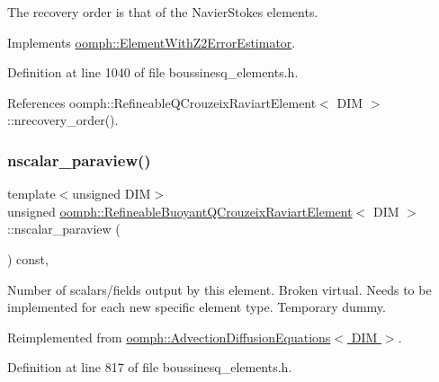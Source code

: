 The recovery order is that of the Navier\+Stokes elements. 



Implements \hyperlink{classoomph_1_1ElementWithZ2ErrorEstimator_af39480835bd3e0f6b2f4f7a9a4044798}{oomph\+::\+Element\+With\+Z2\+Error\+Estimator}.



Definition at line 1040 of file boussinesq\+\_\+elements.\+h.



References oomph\+::\+Refineable\+Q\+Crouzeix\+Raviart\+Element$<$ D\+I\+M $>$\+::nrecovery\+\_\+order().

\mbox{\label{classoomph_1_1RefineableBuoyantQCrouzeixRaviartElement_a2167093a1902a2ed4c79d45eff457ca8}} 
\subsubsection{\texorpdfstring{nscalar\+\_\+paraview()}{nscalar\_paraview()}}
{\footnotesize\ttfamily template$<$unsigned D\+IM$>$ \\
unsigned \hyperlink{classoomph_1_1RefineableBuoyantQCrouzeixRaviartElement}{oomph\+::\+Refineable\+Buoyant\+Q\+Crouzeix\+Raviart\+Element}$<$ D\+IM $>$\+::nscalar\+\_\+paraview (\begin{DoxyParamCaption}{ }\end{DoxyParamCaption}) const\hspace{0.3cm}{\ttfamily [inline]}, {\ttfamily [virtual]}}



Number of scalars/fields output by this element. Broken virtual. Needs to be implemented for each new specific element type. Temporary dummy. 



Reimplemented from \hyperlink{classoomph_1_1AdvectionDiffusionEquations_a70205e9d39d7ff9660a53402d5636c1f}{oomph\+::\+Advection\+Diffusion\+Equations$<$ D\+I\+M $>$}.



Definition at line 817 of file boussinesq\+\_\+elements.\+h.

